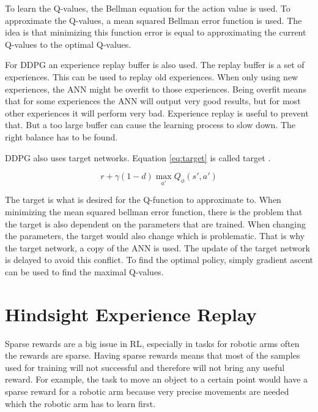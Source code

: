 \vspace{0.5cm}

To learn the Q-values, the Bellman equation for the action value is used. To approximate the Q-values, a mean squared Bellman error function is used.
The idea is that minimizing this function error is equal to approximating the current Q-values to the optimal Q-values.

\vspace{0.5cm}

For DDPG an experience replay buffer is also used. The replay buffer is a set of experiences. This can be used to replay old experiences. When only using new experiences, the ANN might be overfit to those experiences. Being overfit means that for some experiences the ANN will output very good results, but for most other experiences it will perform very bad. Experience replay is useful to prevent that. But a too large buffer can cause the learning process to slow down. The right balance has to be found.

DDPG also uses target networks. Equation \ref{eq:target} is called target \cite{ddpg}.

\begin{equation}
\label{eq:target}
r + \gamma (1-d) \max_{a'} Q_\phi(s',a')
\end{equation}

The target is what is desired for the Q-function to approximate to.
When minimizing the mean squared bellman error function, there is the problem that the target is also dependent on the parameters that are trained. When changing the parameters, the target would also change which is problematic. That is why the target network, a copy of the ANN is used. The update of the target network is delayed to avoid this conflict.
To find the optimal policy, simply gradient ascent can be used to find the maximal Q-values.


\section{Hindsight Experience Replay}



Sparse rewards are a big issue in RL, especially in tasks for robotic arms often the rewards are sparse. Having sparse rewards means that most of the samples used for training will not successful and therefore will not bring any useful reward. For example, the task to move an object to a certain point would have a sparse reward for a robotic arm because very precise movements are needed which the robotic arm has to learn first.
 
